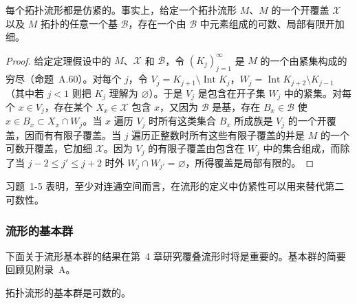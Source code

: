 \documentclass[../../main.tex]{subfiles}
\begin{document}
\begin{theorem}[流形是仿紧的]\label{theorem:ch01-流形仿紧}
每个拓扑流形都是仿紧的。事实上，给定一个拓扑流形 $M$、$M$ 的一个开覆盖 $\mathcal{X}$ 以及 $M$ 拓扑的任意一个基 $\mathcal{B}$，存在一个由 $\mathcal{B}$ 中元素组成的可数、局部有限开加细。
\end{theorem}

\begin{proof}
给定定理假设中的 $M$、$\mathcal{X}$ 和 $\mathcal{B}$，令 $(K_{j})_{j=1}^{\infty}$ 是 $M$ 的一个由紧集构成的穷尽（命题~A.60）。对每个 $j$，令 $V_{j}=K_{j+1}\setminus\operatorname{Int}K_{j}$，$W_{j}=\operatorname{Int}K_{j+2}\setminus K_{j-1}$（其中若 $j<1$ 则把 $K_{j}$ 理解为 $\varnothing$）。于是 $V_{j}$ 是包含在开子集 $W_{j}$ 中的紧集。对每个 $x\in V_{j}$，存在某个 $X_{x}\in\mathcal{X}$ 包含 $x$，又因为 $\mathcal{B}$ 是基，存在 $B_{x}\in\mathcal{B}$ 使 $x\in B_{x}\subset X_{x}\cap W_{j}$。当 $x$ 遍历 $V_{j}$ 时所有这类集合 $B_{x}$ 所成族是 $V_{j}$ 的一个开覆盖，因而有有限子覆盖。当 $j$ 遍历正整数时所有这些有限子覆盖的并是 $M$ 的一个可数开覆盖，它加细 $\mathcal{X}$。因为 $V_{j}$ 的有限子覆盖由包含在 $W_{j}$ 中的集合组成，而除了当 $j-2\leqslant j'\leqslant j+2$ 时外 $W_{j}\cap W_{j'}=\varnothing$，所得覆盖是局部有限的。
\end{proof}

习题~1-5 表明，至少对连通空间而言，在流形的定义中仿紧性可以用来替代第二可数性。

\subsubsection{流形的基本群}\label{subsubsection:ch01-流形的基本群}

下面关于流形基本群的结果在第~4 章研究覆叠流形时将是重要的。基本群的简要回顾见附录~A。

\begin{proposition}\label{proposition:ch01-基本群可数}
拓扑流形的基本群是可数的。
\end{proposition}
\end{document}
